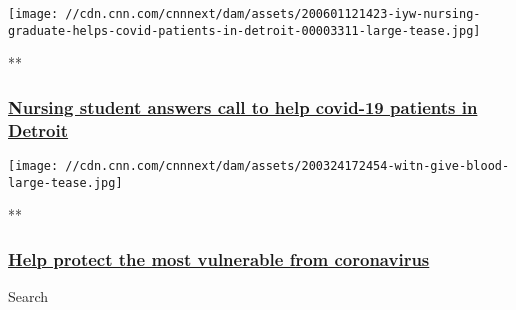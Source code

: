 \href{/videos/us/2020/06/01/iyw-nursing-graduate-helps-covid-patients-in-detroit.cnn}{}

\texttt{[image: //cdn.cnn.com/cnnnext/dam/assets/200601121423-iyw-nursing-graduate-helps-covid-patients-in-detroit-00003311-large-tease.jpg]}

**

\hypertarget{nursing-student-answers-call-to-help-covid-19-patients-in-detroit}{%
\subsubsection{\texorpdfstring{\href{/videos/us/2020/06/01/iyw-nursing-graduate-helps-covid-patients-in-detroit.cnn}{Nursing
student answers call to help covid-19 patients in
Detroit}}{Nursing student answers call to help covid-19 patients in Detroit}}\label{nursing-student-answers-call-to-help-covid-19-patients-in-detroit}}

\href{/videos/us/2020/03/24/how-to-help-nonprofits-coronavirus-iyw.cnn}{}

\texttt{[image: //cdn.cnn.com/cnnnext/dam/assets/200324172454-witn-give-blood-large-tease.jpg]}

**

\hypertarget{help-protect-the-most-vulnerable-from-coronavirus}{%
\subsubsection{\texorpdfstring{\href{/videos/us/2020/03/24/how-to-help-nonprofits-coronavirus-iyw.cnn}{Help
protect the most vulnerable from
coronavirus}}{Help protect the most vulnerable from coronavirus}}\label{help-protect-the-most-vulnerable-from-coronavirus}}

Search

